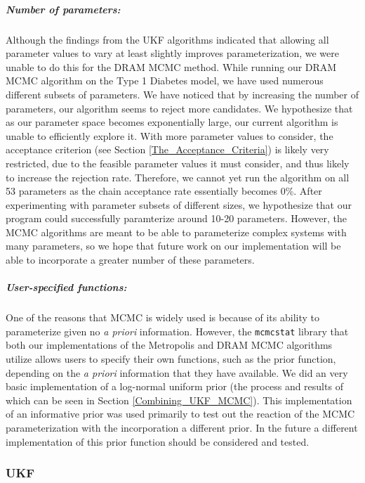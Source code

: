 \subparagraph{Number of parameters:} \label{section:NumParamsMCMC} Although the findings from the UKF algorithms indicated that allowing all parameter values to vary at least slightly improves parameterization, we were unable to do this for the DRAM MCMC method. While running our DRAM MCMC algorithm on the Type 1 Diabetes model, we have used numerous different subsets of parameters. We have noticed that by increasing the number of parameters, our algorithm seems to reject more candidates. We hypothesize that as our parameter space becomes exponentially large, our current algorithm is unable to efficiently explore it. With more parameter values to consider, the acceptance criterion (see Section \ref{The_Acceptance_Criteria}) is likely very restricted, due to the feasible parameter values it must consider, and thus likely to increase the rejection rate. Therefore, we cannot yet run the algorithm on all 53 parameters as the chain acceptance rate essentially becomes 0\%. After experimenting with parameter subsets of different sizes, we hypothesize that our program could successfully paramterize around 10-20 parameters. However, the MCMC algorithms are meant to be able to parameterize complex systems with many parameters, so we hope that future work on our implementation will be able to incorporate a greater number of these parameters.

\subparagraph{User-specified functions:} One of the reasons that MCMC is widely used is because of its ability to parameterize given no \textit{a priori} information. However, the \texttt{mcmcstat} library that both our implementations of the Metropolis and DRAM MCMC algorithms utilize allows users to specify their own functions, such as the prior function, depending on the \textit{a priori} information that they have available. We did an very basic implementation of a log-normal uniform prior (the process and results of which can be seen in Section \ref{Combining_UKF_MCMC}). This implementation of an informative prior was used primarily to test out the reaction of the MCMC parameterization with the incorporation a different prior. In the future a different implementation of this prior function should be considered and tested. 


\subsubsection{UKF}
